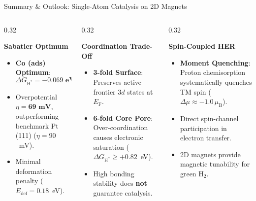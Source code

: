 \documentclass[aspectratio=169]{beamer}
\begin{document}
\begin{frame}{Summary \& Outlook: Single-Atom Catalysis on 2D Magnets}
  \begin{columns}[T]
    \begin{column}{0.32\textwidth}
      \begin{block}{\centering \textbf{Sabatier Optimum}}
        \scriptsize
      \begin{itemize}\setlength{\itemsep}{1.5pt}
          \item \textbf{Co (ads) Optimum}:
            \[
              \Delta G_{\text{H}^*} = \mathbf{-0.069\text{ eV}}
            \]
          \item Overpotential $\eta = \mathbf{69\text{ mV}}$, outperforming benchmark Pt (111) ($\eta = 90$~mV).
          \item Minimal deformation penalty ($E_{\text{def}} = 0.18$~eV).
        \end{itemize}
      \end{block}
    \end{column}

    \begin{column}{0.32\textwidth}
      \begin{alertblock}{\centering \textbf{Coordination Trade-Off}}
        \scriptsize
      \begin{itemize}\setlength{\itemsep}{1.5pt}
          \item \textbf{3-fold Surface}: Preserves active frontier $3d$ states at $E_{\text{F}}$.
          \item \textbf{6-fold Core Pore}: Over-coordination causes electronic saturation ($\Delta G_{\text{H}^*} \ge +0.82$~eV).
          \item High bonding stability does \textbf{not} guarantee catalysis.
        \end{itemize}
      \end{alertblock}
    \end{column}

    \begin{column}{0.32\textwidth}
      \begin{exampleblock}{\centering \textbf{Spin-Coupled HER}}
        \scriptsize
      \begin{itemize}\setlength{\itemsep}{1.5pt}
          \item \textbf{Moment Quenching}: Proton chemisorption systematically quenches TM spin ($\Delta\mu \approx -1.0\,\mu_{\text{B}}$).
          \item Direct spin-channel participation in electron transfer.
          \item 2D magnets provide magnetic tunability for green $\text{H}_2$.
        \end{itemize}
      \end{exampleblock}
    \end{column}
  \end{columns}


\end{frame}
\end{document}
